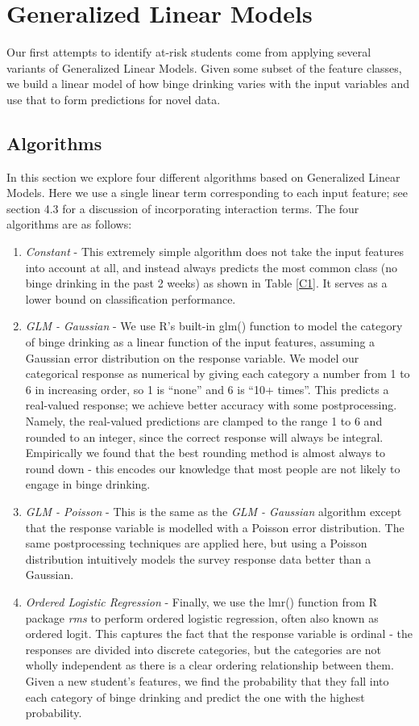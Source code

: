 \section{Generalized Linear Models}
\label{sec:linear}

Our first attempts to identify at-risk students come from applying several variants of Generalized Linear Models.  Given some subset of the feature classes, we build a linear model of how binge drinking varies with the input variables and use that to form predictions for novel data.

\subsection{Algorithms}

In this section we explore four different algorithms based on Generalized Linear Models.  Here we use a single linear term corresponding to each input feature; see section 4.3 for a discussion of incorporating interaction terms.  The four algorithms are as follows:

\begin{enumerate}
\item \emph{Constant} - This extremely simple algorithm does not take the input features into account at all, and instead always predicts the most common class (no binge drinking in the past 2 weeks) as shown in Table \ref{C1}.  It serves as a lower bound on classification performance.
\item \emph{GLM - Gaussian} - We use R's built-in glm() function \cite{glm} to model the category of binge drinking as a linear function of the input features, assuming a Gaussian error distribution on the response variable.  We model our categorical response as numerical by giving each category a number from 1 to 6 in increasing order, so 1 is ``none'' and 6 is ``10+ times''.  This predicts a real-valued response; we achieve better accuracy with some postprocessing.  Namely, the real-valued predictions are clamped to the range 1 to 6 and rounded to an integer, since the correct response will always be integral.  Empirically we found that the best rounding method is almost always to round down - this encodes our knowledge that most people are not likely to engage in binge drinking.
\item \emph{GLM - Poisson} - This is the same as the \emph{GLM - Gaussian} algorithm except that the response variable is modelled with a Poisson error distribution.  The same postprocessing techniques are applied here, but using a Poisson distribution intuitively models the survey response data better than a Gaussian.
\item \emph{Ordered Logistic Regression} - Finally, we use the lmr() function from R package \emph{rms} \cite{lrm} to perform ordered logistic regression, often also known as ordered logit.  This captures the fact that the response variable is ordinal - the responses are divided into discrete categories, but the categories are not wholly independent as there is a clear ordering relationship between them.  Given a new student's features, we find the probability that they fall into each category of binge drinking and predict the one with the highest probability.
\end{enumerate}

